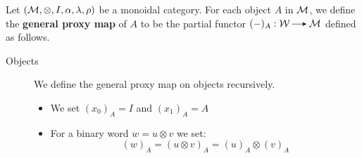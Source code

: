 \begin{definition}
    Let $(\mathcal{M}, \otimes, I, \alpha, \lambda, \rho)$ be a monoidal category. 
    For each object $A$ in $\mathcal{M}$, we define the \textbf{general proxy map} of $A$
    to be the partial functor $(-)_A: \ww \to \mm$ defined as follows. 

\begin{description}
    \item[Objects] 
    We define the general proxy map on objects recursively. 
    \begin{itemize}
        \item We set $(x_0)_A = I$ and $(x_1)_A = A$
        \item For a binary word $w = u \otimes v$ we set:
        \[
            (w)_A = (u \otimes v)_A = (u)_A\otimes (v)_A
        \] 
    \end{itemize}


\end{description}
\end{definition}
